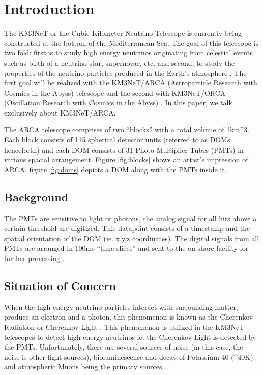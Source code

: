 \hypertarget{introduction}{%
\section{Introduction}\label{introduction}}

The KM3NeT or the Cubic Kilometer Neutrino Telescope is currently being
constructed at the bottom of the Mediterranean Sea. The goal of this telescope
is two fold: first is to study high energy neutrinos originating from celestial
events such as birth of a neutrino star, supernovae, etc. and second, to study
the properties of the neutrino particles produced in the Earth's atmosphere
\cite{adrian2016letter}. The first goal will be realized with the KM3NeT/ARCA
(Astroparticle Research with Cosmics in the Abyss) telescope and the second
with KM3NeT/ORCA (Oscillation Research with Cosmics in the Abyss)
\cite{adrian2016letter}. In this paper, we talk exclusively about KM3NeT/ARCA.

The ARCA telescope comprises of two ``blocks'' with a total volume of
1km^{3}. Each block consists of 115 spherical detector units (referred to as
DOMs henceforth) and each DOM consists of 31 Photo Multiplier Tubes (PMTs) in
various spacial arrangement. Figure \ref{fig:blocks} shows an artist's
impression of ARCA, figure \ref{fig:doms} depicts a DOM along with the PMTs
inside it.

\subsection{Background}\label{background}

The PMTs are sensitive to light or photons, the analog signal for all hits
above a certain threshold are digitized. This datapoint consists of a timestamp
and the spatial orientation of the DOM (ie. x,y,z coordinates). The digital
signals from all PMTs are arranged in 100ms ``time slices'' and sent to the
on-shore facility for further processing \cite{aiello2019km3net}.

\subsection{Situation of Concern}\label{situation-of-concern}

When the high energy neutrino particles interact with surrounding matter,
produce an electron and a photon, this phenomenon is known as the Cherenkov
Radiation or Cherenkov Light \cite{margiotta2014km3net}. This phenomenon is
utilized in the KM3NeT telescopes to detect high energy neutrinos ie. the
Cherenkov Light is detected by the PMTs. Unfortunately, there are several
sources of noise (in this case, the noise is other light sources),
bioluminescense and decay of Potassium 40 (^{40}K) and atmospheric Muons being
the primary sources \cite{post2019km3nnet}.


